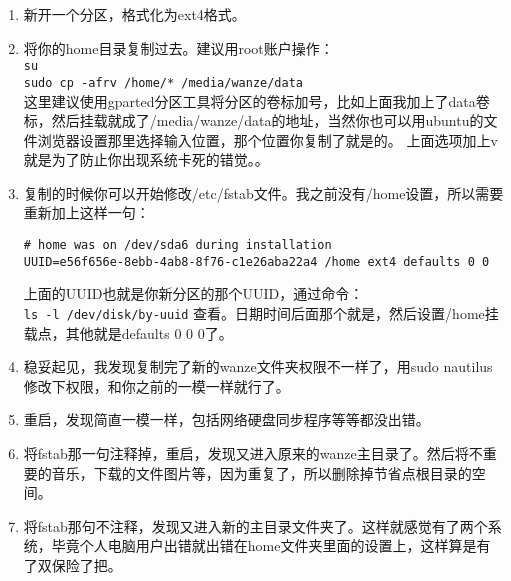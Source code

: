 \documentclass[11pt,oneside]{book}
\begin{document}
\begin{common-format}
\begin{enumerate}   
\item 新开一个分区，格式化为ext4格式。
\item 将你的home目录复制过去。建议用root账户操作：\\
\verb+su+\\
\verb+sudo cp -afrv /home/* /media/wanze/data+\\
这里建议使用gparted分区工具将分区的卷标加号，比如上面我加上了data卷标，然后挂载就成了/media/wanze/data的地址，当然你也可以用ubuntu的文件浏览器设置那里选择输入位置，那个位置你复制了就是的。
上面选项加上v就是为了防止你出现系统卡死的错觉。。
\item 复制的时候你可以开始修改/etc/fstab文件。我之前没有/home设置，所以需要重新加上这样一句：
\begin{verbatim} 
# home was on /dev/sda6 during installation
UUID=e56f656e-8ebb-4ab8-8f76-c1e26aba22a4 /home ext4 defaults 0 0
\end{verbatim}
上面的UUID也就是你新分区的那个UUID，通过命令：\\
\verb+ls -l /dev/disk/by-uuid+
查看。日期时间后面那个就是，然后设置/home挂载点，其他就是defaults 0 0 0了。
\item 稳妥起见，我发现复制完了新的wanze文件夹权限不一样了，用sudo nautilus 修改下权限，和你之前的一模一样就行了。
\item 重启，发现简直一模一样，包括网络硬盘同步程序等等都没出错。
\item 将fstab那一句注释掉，重启，发现又进入原来的wanze主目录了。然后将不重要的音乐，下载的文件图片等，因为重复了，所以删除掉节省点根目录的空间。
\item 将fstab那句不注释，发现又进入新的主目录文件夹了。这样就感觉有了两个系统，毕竟个人电脑用户出错就出错在home文件夹里面的设置上，这样算是有了双保险了把。
\end{enumerate}






\end{common-format}
\end{document}
